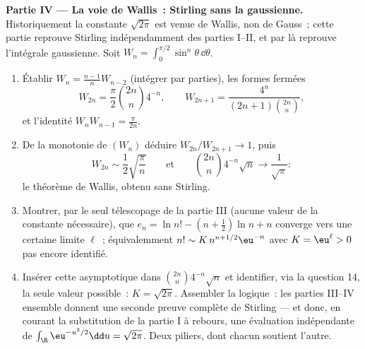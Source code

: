 \begin{problem}
\medskip
\noindent\textbf{Partie IV --- La voie de Wallis~: Stirling
sans la gaussienne.} Historiquement la constante
$\sqrt{2\pi}$ est venue de Wallis, non de Gauss~; cette
partie reprouve Stirling indépendamment des parties I--II, et
par là reprouve l'intégrale gaussienne. Soit $W_n =
\int_0^{\pi/2}\sin^n\theta\, \dd\theta$.
\begin{enumerate}[resume]
  \item Établir $W_n = \frac{n-1}nW_{n-2}$ (intégrer par
        parties), les formes fermées
        \[
        W_{2n} = \frac\pi2\binom{2n}n4^{-n}, \qquad
        W_{2n+1} = \frac{4^n}{(2n+1)\binom{2n}n},
        \]
        et l'identité $W_nW_{n-1} = \frac\pi{2n}$.
  \item De la monotonie de $(W_n)$ déduire
        $W_{2n}/W_{2n+1} \to 1$, puis
        \[
        W_{2n} \sim \frac12\sqrt{\frac\pi n}
        \qquad\text{et}\qquad
        \binom{2n}n4^{-n}\sqrt n \longrightarrow
        \frac1{\sqrt\pi} :
        \]
        le théorème de Wallis, obtenu sans Stirling.
  \item Montrer, par le seul télescopage de la partie III
        (aucune valeur de la constante nécessaire), que
        $e_n = \ln n! - (n + \frac12)\ln n + n$ converge
        vers une certaine limite $\ell$~; équivalemment $n!
        \sim K\,n^{n+1/2}\eu^{-n}$ avec $K = \eu^\ell > 0$
        pas encore identifié.
  \item Insérer cette asymptotique dans
        $\binom{2n}n4^{-n}\sqrt n$ et identifier, via la
        question 14, la seule valeur possible~: $K =
        \sqrt{2\pi}$. Assembler la logique~: les parties
        III--IV ensemble donnent une seconde preuve
        complète de Stirling --- et donc, en courant la
        substitution de la partie I à rebours, une
        évaluation indépendante de
        $\int_\R\eu^{-u^2/2}\dd u = \sqrt{2\pi}$. Deux
        piliers, dont chacun soutient l'autre.
\end{enumerate}


\end{problem}
